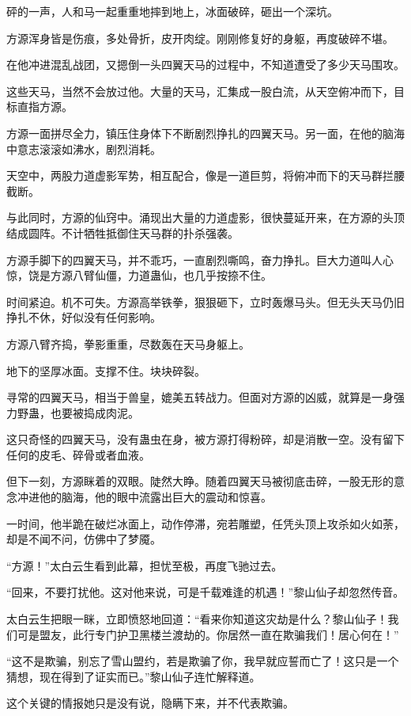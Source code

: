 \begin{this_body}
砰的一声，人和马一起重重地摔到地上，冰面破碎，砸出一个深坑。

方源浑身皆是伤痕，多处骨折，皮开肉绽。刚刚修复好的身躯，再度破碎不堪。

在他冲进混乱战团，又摁倒一头四翼天马的过程中，不知道遭受了多少天马围攻。

这些天马，当然不会放过他。大量的天马，汇集成一股白流，从天空俯冲而下，目标直指方源。

方源一面拼尽全力，镇压住身体下不断剧烈挣扎的四翼天马。另一面，在他的脑海中意志滚滚如沸水，剧烈消耗。

天空中，两股力道虚影军势，相互配合，像是一道巨剪，将俯冲而下的天马群拦腰截断。

与此同时，方源的仙窍中。涌现出大量的力道虚影，很快蔓延开来，在方源的头顶结成圆阵。不计牺牲抵御住天马群的扑杀强袭。

方源手脚下的四翼天马，并不乖巧，一直剧烈嘶鸣，奋力挣扎。巨大力道叫人心惊，饶是方源八臂仙僵，力道蛊仙，也几乎按捺不住。

时间紧迫。机不可失。方源高举铁拳，狠狠砸下，立时轰爆马头。但无头天马仍旧挣扎不休，好似没有任何影响。

方源八臂齐捣，拳影重重，尽数轰在天马身躯上。

地下的坚厚冰面。支撑不住。块块碎裂。

寻常的四翼天马，相当于兽皇，媲美五转战力。但面对方源的凶威，就算是一身强力野蛊，也要被捣成肉泥。

这只奇怪的四翼天马，没有蛊虫在身，被方源打得粉碎，却是消散一空。没有留下任何的皮毛、碎骨或者血液。

但下一刻，方源眯着的双眼。陡然大睁。随着四翼天马被彻底击碎，一股无形的意念冲进他的脑海，他的眼中流露出巨大的震动和惊喜。

一时间，他半跪在破烂冰面上，动作停滞，宛若雕塑，任凭头顶上攻杀如火如荼，却是不闻不问，仿佛中了梦魇。

“方源！”太白云生看到此幕，担忧至极，再度飞驰过去。

“回来，不要打扰他。这对他来说，可是千载难逢的机遇！”黎山仙子却忽然传音。

太白云生把眼一眯，立即愤怒地回道：“看来你知道这灾劫是什么？黎山仙子！我们可是盟友，此行专门护卫黑楼兰渡劫的。你居然一直在欺骗我们！居心何在！”

“这不是欺骗，别忘了雪山盟约，若是欺骗了你，我早就应誓而亡了！这只是一个猜想，现在得到了证实而已。”黎山仙子连忙解释道。

这个关键的情报她只是没有说，隐瞒下来，并不代表欺骗。


\end{this_body}
